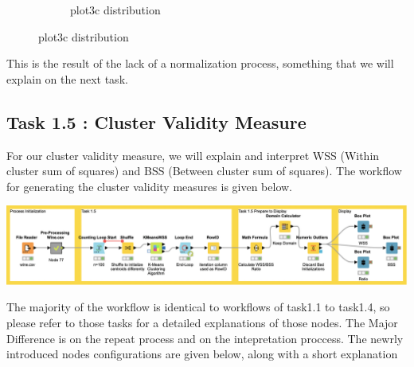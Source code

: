\documentclass[11pt]{article}
\begin{document}
\begin{figure}[H]
\begin{subfigure}{0.4\textwidth}
					\caption{plot3c distribution}
					\label{fig:third}
				\end{subfigure}	
				\label{fig:figures}
			\end{figure}
			\fi
			 This is the result of the lack of a normalization process, something that we will explain on the next task.
		\subsection*{Task 1.5 : Cluster Validity Measure}
			For our cluster validity measure, we will explain and interpret WSS (Within cluster sum of squares) and BSS (Between cluster sum of squares). The workflow for generating the cluster validity measures is given below.
			\iftrue
			\begin{center}
				\includegraphics[scale=0.25]{res/t1/t15/t15-workflow}
			\end{center}
			\fi
			The majority of the workflow is identical to workflows of task1.1 to task1.4, so please refer to those tasks for a detailed explanations of those nodes. The Major Difference is on the repeat process and on the intepretation proccess. The newrly introduced nodes configurations are given below, along with a short explanation
			\iftrue
\end{document}
